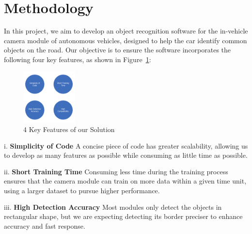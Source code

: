 \documentclass[journal,transmag]{IEEEtran}
\begin{document}
\vspace{0.05cm}
\section{Methodology}


In this project, we aim to develop an object recognition software for the in-vehicle camera module of autonomous vehicles, designed to help the car identify common objects on the road. Our objective is to ensure the software incorporates the following four key features, as shown in Figure~\ref{fig:feature}: 

\begin{figure}[h]
    \centering
    \includegraphics[width=0.25\textwidth]{Feature.jpg} 
    \caption{4 Key Features of our Solution}
    \label{fig:feature}
\end{figure}

\vspace{0.1cm}
i. \textbf{Simplicity of Code} A concise piece of code has greater scalability, allowing us to develop as many features as possible while consuming as little time as possible.

ii. \textbf{Short Training Time} Consuming less time during the training process ensures that the camera module can train on more data within a given time unit, using a larger dataset to pursue higher performance.

iii. \textbf{High Detection Accuracy} Most modules only detect the objects in rectangular shape, but we are expecting detecting its border preciser to enhance accuracy and fast response. 
\end{document}
